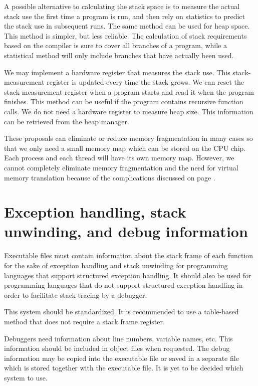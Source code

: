 \documentclass[forwardcom.tex]{subfiles}
\begin{document}
A possible alternative to calculating the stack space is to measure the actual stack use the first time a program is run, and then rely on statistics to predict the stack use in subsequent runs. The same method can be used for heap space. This method is simpler, but less reliable. The calculation of stack requirements based on the compiler is sure to cover all branches of a program, while a statistical method will only include branches that have actually been used. 
\vv

We may implement a hardware register that measures the stack use. This stack-measurement register is updated every time the stack grows. We can reset the stack-measurement register when a program starts and read it when the program finishes. This method can be useful if the program contains recursive function calls. 
We do not need a hardware register to measure heap size. This information can be retrieved from the heap manager. 
\vv

These proposals can eliminate or reduce memory fragmentation in many cases so that we only need a small memory map which can be stored on the CPU chip. Each process and each thread will have its own memory map. However, we cannot completely eliminate memory fragmentation and the need for virtual memory translation because of the complications discussed on page \pageref{memoryManagement}.

\section{Exception handling, stack unwinding, and debug information} \label{exceptionHandling}
Executable files must contain information about the stack frame of each function for the sake of exception handling and stack unwinding for programming languages that support structured exception handling. 
It should also be used for programming languages that do not support structured exception handling in order to facilitate stack tracing by a debugger. 
\vv

This system should be standardized.  
It is recommended to use a table-based method that does not require a stack frame register. 
\vv

Debuggers need information about line numbers, variable names, etc. This information should be included in object files when requested. The debug information may be copied into the executable file or saved in a separate file which is stored together with the executable file. It is yet to be decided which system to use. 
\end{document}
